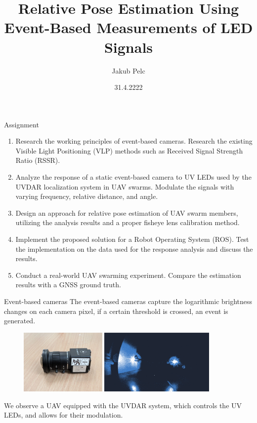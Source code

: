\documentclass{beamer}
\title{Relative Pose Estimation Using Event-Based Measurements of LED Signals}
\date{31.4.2222}
\author{Jakub Pelc}
\institute{Faculty of Electrical Engineering, Czech Technical University in Prague}
\begin{document}
\maketitle

\begin{frame}{Assignment}

\small{
\begin{enumerate}
    \item Research the working principles of event-based cameras. Research the existing Visible Light Positioning (VLP) methods such as Received Signal Strength Ratio (RSSR).
    \item Analyze the response of a static event-based camera to UV LEDs used by the UVDAR localization system in UAV swarms. Modulate the signals with varying frequency, relative distance, and angle.
    \item Design an approach for relative pose estimation of UAV swarm members, utilizing the analysis results and a proper
fisheye lens calibration method.
    \item Implement the proposed solution for a Robot Operating System (ROS). Test the implementation on the data used for
the response analysis and discuss the results.
    \item Conduct a real-world UAV swarming experiment. Compare the estimation results with a GNSS ground truth. 
\end{enumerate}
}

\end{frame}

\begin{frame}{Event-based cameras}
The event-based cameras capture the logarithmic brightness changes on each camera pixel, if a certain threshold is crossed, an event is generated.

\begin{figure}[H]
    \centering
    \includegraphics[width=0.374\textwidth]{../fig/photos/evk4.jpg}
    \includegraphics[width=0.50\textwidth]{../fig/photos/meas1.png}
    \label{fig:evk4}
\end{figure}

We observe a UAV equipped with the UVDAR system, which controls the UV LEDs, and allows for their modulation.

\end{frame}
\end{document}
